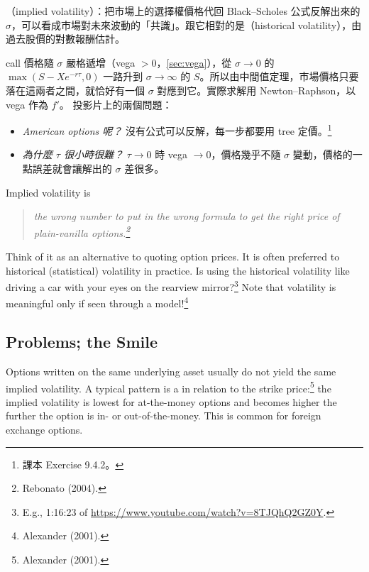 \suppstart
\begin{remark}
	（implied volatility）：把市場上的選擇權價格代回 Black--Scholes 公式反解出來的 $\sigma$，可以看成市場對未來波動的「共識」。跟它相對的是（historical volatility），由過去股價的對數報酬估計。
\end{remark}

\begin{note}
	call 價格隨 $\sigma$ 嚴格遞增（vega $>0$，\autoref{sec:vega}），從 $\sigma\to0$ 的 $\max(S-Xe^{-r\tau},0)$ 一路升到 $\sigma\to\infty$ 的 $S$。所以由中間值定理，市場價格只要落在這兩者之間，就恰好有一個 $\sigma$ 對應到它。實際求解用 Newton--Raphson，以 vega 作為 $f'$。
	投影片上的兩個問題：
	\begin{itemize}[nosep]
		\item \emph{American options 呢？} 沒有公式可以反解，每一步都要用 tree 定價。\footnote{課本 Exercise 9.4.2。}
		\item \emph{為什麼 $\tau$ 很小時很難？} $\tau\to0$ 時 vega $\to0$，價格幾乎不隨 $\sigma$ 變動，價格的一點誤差就會讓解出的 $\sigma$ 差很多。
	\end{itemize}
\end{note}
\suppend

Implied volatility is
\begin{quote}
	\itshape the wrong number to put in the wrong formula to get the right price of plain-vanilla options.\footnote{Rebonato (2004).}
\end{quote}
Think of it as an alternative to quoting option prices.
It is often preferred to historical (statistical) volatility in practice.
Is using the historical volatility like driving a car with your eyes on the rearview mirror?\footnote{E.g., 1:16:23 of \url{https://www.youtube.com/watch?v=8TJQhQ2GZ0Y}.}
Note that volatility is meaningful only if seen through a model!\footnote{Alexander (2001).}

\subsection{Problems; the Smile}


Options written on the same underlying asset usually do not yield the same implied volatility.
A typical pattern is a  in relation to the strike price:\footnote{Alexander (2001).}
the implied volatility is lowest for at-the-money options and becomes higher the further the option is in- or out-of-the-money.
This is common for foreign exchange options.

